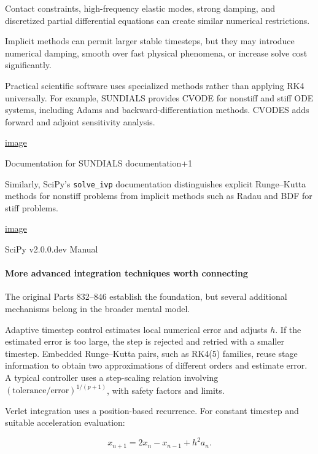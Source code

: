 Contact constraints, high-frequency elastic modes, strong damping, and discretized partial differential equations can create similar numerical restrictions.

Implicit methods can permit larger stable timesteps, but they may introduce numerical damping, smooth over fast physical phenomena, or increase solve cost significantly.

Practical scientific software uses specialized methods rather than applying RK4 universally. For example, SUNDIALS provides CVODE for nonstiff and stiff ODE systems, including Adams and backward-differentiation methods. CVODES adds forward and adjoint sensitivity analysis. 

\href{https://www.google.com/s2/favicons?domain=https://sundials.readthedocs.io&sz=32}{image}

Documentation for SUNDIALS documentation+1

Similarly, SciPy's \texttt{solve\_ivp} documentation distinguishes explicit Runge--Kutta methods for nonstiff problems from implicit methods such as Radau and BDF for stiff problems. 

\href{https://www.google.com/s2/favicons?domain=https://scipy.github.io&sz=32}{image}

SciPy v2.0.0.dev Manual

\paragraph{More advanced integration techniques worth connecting}\label{02-foundations-ii-ch025-more-advanced-integration-techniques-worth-connecting}

The original Parts 832--846 establish the foundation, but several additional mechanisms belong in the broader mental model.

Adaptive timestep control estimates local numerical error and adjusts \(h\). If the estimated error is too large, the step is rejected and retried with a smaller timestep. Embedded Runge--Kutta pairs, such as RK4(5) families, reuse stage information to obtain two approximations of different orders and estimate error. A typical controller uses a step-scaling relation involving \((\text{tolerance}/\text{error})^{1/(p+1)}\), with safety factors and limits.

Verlet integration uses a position-based recurrence. For constant timestep and suitable acceleration evaluation:

\[
x_{n+1}=2x_n-x_{n-1}+h^2a_n.
\]

